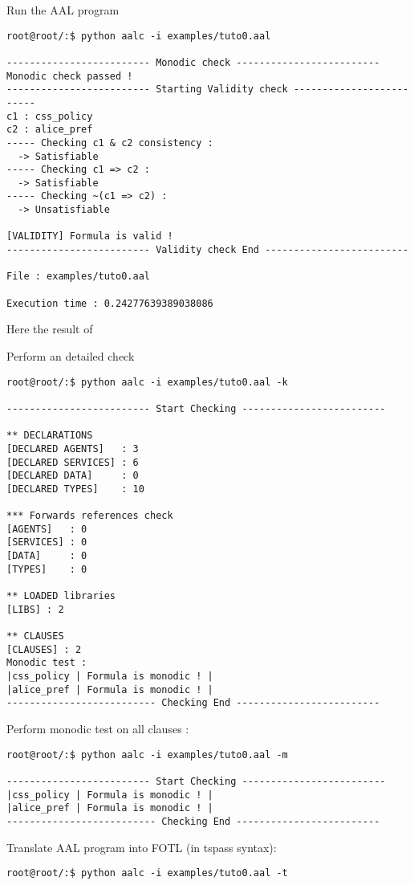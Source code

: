 \begin{itemize}
	\item Run the AAL program
{\lstset{style=shell}
\begin{lstlisting}
root@root/:$ python aalc -i examples/tuto0.aal

------------------------- Monodic check -------------------------
Monodic check passed !
------------------------- Starting Validity check -------------------------
c1 : css_policy
c2 : alice_pref
----- Checking c1 & c2 consistency :
  -> Satisfiable
----- Checking c1 => c2 :
  -> Satisfiable
----- Checking ~(c1 => c2) :
  -> Unsatisfiable

[VALIDITY] Formula is valid !
------------------------- Validity check End -------------------------

File : examples/tuto0.aal

Execution time : 0.24277639389038086
\end{lstlisting}

Here the result of

	\item Perform an detailed check
\begin{lstlisting}
root@root/:$ python aalc -i examples/tuto0.aal -k

------------------------- Start Checking -------------------------

** DECLARATIONS
[DECLARED AGENTS]   : 3
[DECLARED SERVICES] : 6
[DECLARED DATA]     : 0
[DECLARED TYPES]    : 10

*** Forwards references check
[AGENTS]   : 0
[SERVICES] : 0
[DATA]     : 0
[TYPES]    : 0

** LOADED libraries
[LIBS] : 2

** CLAUSES
[CLAUSES] : 2
Monodic test :
|css_policy | Formula is monodic ! |
|alice_pref | Formula is monodic ! |
-------------------------- Checking End -------------------------
\end{lstlisting}


	\item Perform monodic test on all clauses :
\begin{lstlisting}
root@root/:$ python aalc -i examples/tuto0.aal -m

------------------------- Start Checking -------------------------
|css_policy | Formula is monodic ! |
|alice_pref | Formula is monodic ! |
-------------------------- Checking End -------------------------
\end{lstlisting}


	\item Translate AAL program into FOTL (in tspass syntax):
\begin{lstlisting}
root@root/:$ python aalc -i examples/tuto0.aal -t


\end{lstlisting}}
\end{itemize}
